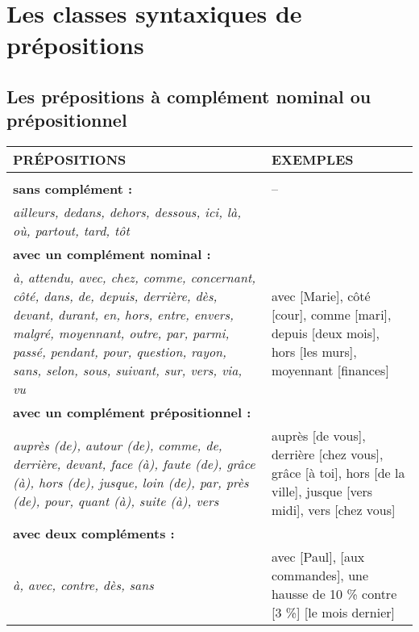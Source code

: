 \documentclass[UTF8]{report}
\begin{document}
\section{Les classes syntaxiques de prépositions}

\subsection{Les prépositions à complément nominal ou prépositionnel}

\begin{table}[H]
    \centering
    \small
    \setlength{\extrarowheight}{2pt}
    \begin{tabular}{|>{\raggedright\arraybackslash}p{}|>{\raggedright\arraybackslash}p{}|}
        \hline
        \rowcolor{cyan!20}
        \textbf{PRÉPOSITIONS} & \textbf{EXEMPLES} \\
        \hline
        \multicolumn{2}{|c|}{\cellcolor[HTML]{F2F2F2}\textbf{SIMPLES}} \\ %
        \hline
        \textbf{sans complément :} & -- \\
        \textit{ailleurs, dedans, dehors, dessous, ici, là, où, partout, tard, tôt} & \\
        \hline
        \textbf{avec un complément nominal :} & \\
        \textit{à, attendu, avec, chez, comme, concernant, côté, dans, de, depuis, derrière, dès, devant, durant, en, hors, entre, envers, malgré, moyennant, outre, par, parmi, passé, pendant, pour, question, rayon, sans, selon, sous, suivant, sur, vers, via, vu} & avec [Marie], côté [cour], comme [mari], depuis [deux mois], hors [les murs], moyennant [finances] \\
        \hline
        \textbf{avec un complément prépositionnel :} & \\
        \textit{auprès (de), autour (de), comme, de, derrière, devant, face (à), faute (de), grâce (à), hors (de), jusque, loin (de), par, près (de), pour, quant (à), suite (à), vers} & auprès [de vous], derrière [chez vous], grâce [à toi], hors [de la ville], jusque [vers midi], vers [chez vous] \\
        \hline
        \textbf{avec deux compléments :} & \\
        \textit{à, avec, contre, dès, sans} & avec [Paul], [aux commandes], une hausse de 10 \% contre [3 \%] [le mois dernier] \\
        \hline

\end{tabular}
\end{table}
\end{document}
